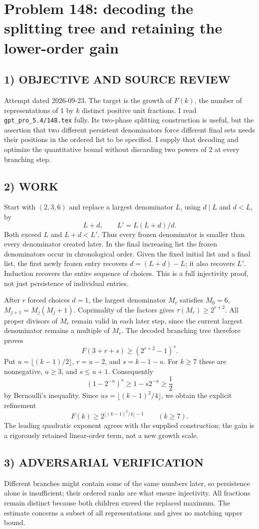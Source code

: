 \section{Problem 148: decoding the splitting tree and retaining the lower-order gain}
\subsection*{1) OBJECTIVE AND SOURCE REVIEW}
Attempt dated 2026-09-23. The target is the growth of $F(k)$, the number of representations of 1 by $k$ distinct positive unit fractions. I read \texttt{gpt\_pro\_5.4/148.tex} fully. Its two-phase splitting construction is useful, but the assertion that two different persistent denominators force different final sets needs their positions in the ordered list to be specified. I supply that decoding and optimize the quantitative bound without discarding two powers of 2 at every branching step.
\subsection*{2) WORK}
Start with $(2,3,6)$ and replace a largest denominator $L$, using $d\mid L$ and $d<L$, by
\[
L+d,\qquad L'=L(L+d)/d.
\]
Both exceed $L$ and $L+d<L'$. Thus every frozen denominator is smaller than every denominator created later. In the final increasing list the frozen denominators occur in chronological order. Given the fixed initial list and a final list, the first newly frozen entry recovers $d=(L+d)-L$; it also recovers $L'$. Induction recovers the entire sequence of choices. This is a full injectivity proof, not just persistence of individual entries.

After $r$ forced choices $d=1$, the largest denominator $M_r$ satisfies $M_0=6$, $M_{j+1}=M_j(M_j+1)$. Coprimality of the factors gives $\tau(M_r)\ge2^{r+2}$. All proper divisors of $M_r$ remain valid in each later step, since the current largest denominator remains a multiple of $M_r$. The decoded branching tree therefore proves
\[
F(3+r+s)\ge(2^{r+2}-1)^s.
\]
Put $u=\lfloor(k-1)/2\rfloor$, $r=u-2$, and $s=k-1-u$. For $k\ge7$ these are nonnegative, $u\ge3$, and $s\le u+1$. Consequently
\[
(1-2^{-u})^s\ge1-s2^{-u}\ge\frac12
\]
by Bernoulli's inequality. Since $us=\lfloor(k-1)^2/4\rfloor$, we obtain the explicit refinement
\[
F(k)\ge2^{\lfloor(k-1)^2/4\rfloor-1}\qquad(k\ge7).
\]
The leading quadratic exponent agrees with the supplied construction; the gain is a rigorously retained linear-order term, not a new growth scale.
\subsection*{3) ADVERSARIAL VERIFICATION}
Different branches might contain some of the same numbers later, so persistence alone is insufficient; their ordered ranks are what ensure injectivity. All fractions remain distinct because both children exceed the replaced maximum. The estimate concerns a subset of all representations and gives no matching upper bound.
